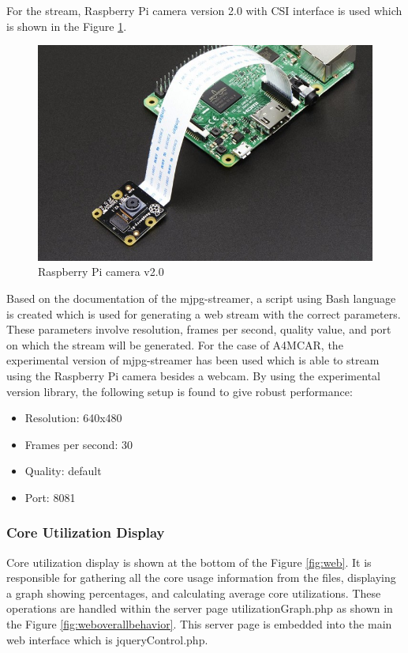 For the stream, Raspberry Pi camera version 2.0 with CSI interface is used which is shown in the Figure \ref{fig:rpicam20}.

\begin{figure}[!ht]
	\centering
	\captionsetup{justification=centering}
	\includegraphics[scale=0.5]{content/images/rpicam20.jpg}
	\caption{Raspberry Pi camera v2.0}
	\label{fig:rpicam20}
\end{figure}

Based on the documentation of the mjpg-streamer, a script using Bash language is created which is used for generating a web stream with the correct parameters. These parameters involve resolution, frames per second, quality value, and port on which the stream will be generated. For the case of A4MCAR, the experimental version of mjpg-streamer has been used which is able to stream using the Raspberry Pi camera besides a webcam. By using the experimental version library, the following setup is found to give robust performance:
\begin{itemize}
	\item Resolution:        640x480
	\item Frames per second: 30
	\item Quality:           default
	\item Port:              8081
\end{itemize}
\subsubsection{Core Utilization Display}
Core utilization display is shown at the bottom of the Figure \ref{fig:web}. It is responsible for gathering all the core usage information from the files, displaying a graph showing percentages, and calculating average core utilizations. These operations are handled within the server page utilizationGraph.php as shown in the Figure \ref{fig:weboverallbehavior}. This server page is embedded into the main web interface which is jqueryControl.php.

